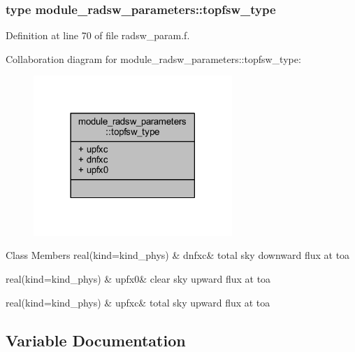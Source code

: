 \subsubsection{type module\+\_\+radsw\+\_\+parameters\+:\+:topfsw\+\_\+type}


Definition at line 70 of file radsw\+\_\+param.\+f.



Collaboration diagram for module\+\_\+radsw\+\_\+parameters\+:\+:topfsw\+\_\+type\+:\nopagebreak
\begin{figure}[H]
\begin{center}
\leavevmode
\includegraphics[width=213pt]{structmodule__radsw__parameters_1_1topfsw__type__coll__graph}
\end{center}
\end{figure}
\begin{DoxyFields}{Class Members}
real(kind=kind\+\_\+phys)\hypertarget{namespacemodule__radsw__parameters_ac1466bb6a9da92a59bdef51439320f35}{}\label{namespacemodule__radsw__parameters_ac1466bb6a9da92a59bdef51439320f35}
&
dnfxc&
total sky downward flux at toa \\
\hline

real(kind=kind\+\_\+phys)\hypertarget{namespacemodule__radsw__parameters_a992c82c935dcb4d6269c905fc184cf48}{}\label{namespacemodule__radsw__parameters_a992c82c935dcb4d6269c905fc184cf48}
&
upfx0&
clear sky upward flux at toa \\
\hline

real(kind=kind\+\_\+phys)\hypertarget{namespacemodule__radsw__parameters_a444a7fd67ff2c22403779a5e83eef09b}{}\label{namespacemodule__radsw__parameters_a444a7fd67ff2c22403779a5e83eef09b}
&
upfxc&
total sky upward flux at toa \\
\hline

\end{DoxyFields}


\subsection{Variable Documentation}
